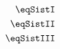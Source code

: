 \begin{equation} \label{eq:exMultiOneN}
	\begin{aligned}
		\eqSistI \\
		\eqSistII \\
		\eqSistIII
	\end{aligned}
\end{equation}